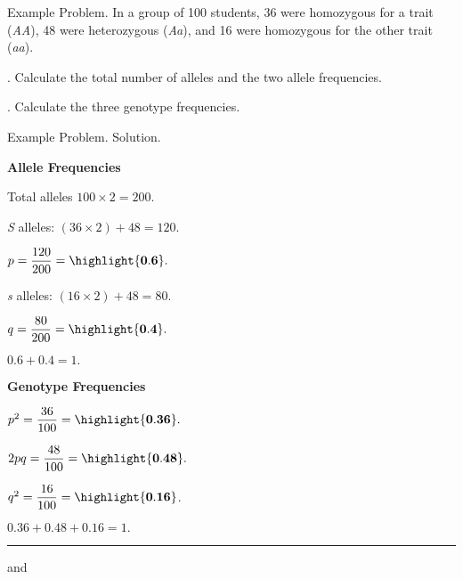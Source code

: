 \documentclass[t]{beamer}
\begin{document}
\begin{frame}{Example Problem. }
	\hangpara In a group of 100 students, 36 were homozygous for a trait (\emph{AA}), 48 were heterozygous (\emph{Aa}), and 16 were homozygous for the other trait (\emph{aa}).

	. Calculate the total number of alleles and the two allele frequencies.

	. Calculate the three genotype frequencies.

\end{frame}
%
{
\begin{frame}{Example Problem. Solution.}
\begin{multicols}{2}

	\hangpara \textbf{Allele Frequencies}
	
	\hangpara Total alleles $100 \times 2 = 200.$
	
	\hangpara \emph{S} alleles: $(36 \times 2) + 48 = 120.$
	
	\hangpara $p = \dfrac{120}{200} = \highlight{\mathbf{0.6}}.$

	\hangpara \emph{s} alleles: $(16 \times 2) + 48 = 80.$ 

	\hangpara $q = \dfrac{80}{200} = \highlight{\mathbf{0.4}}.$
	
	\hangpara $0.6 + 0.4 = 1.$ \checkmark

\columnbreak

	\hangpara \textbf{Genotype Frequencies}
	
	\hangpara $p^2=  \dfrac{36}{100} =\highlight{\mathbf{0.36}}.$  

	\hangpara $2pq = \dfrac{48}{100} = \highlight{\mathbf{0.48}}.$

	\hangpara $q^2 = \dfrac{16}{100} = \highlight{\mathbf{0.16}}$.

	\hangpara $0.36 + 0.48 + 0.16 =1.$ \checkmark
	
	\rule{0.4\textwidth}{0.1pt}\vspace{-0.5\baselineskip}
	
	\hangpara {} and
	

\end{multicols}

\end{frame}
}
\end{document}
